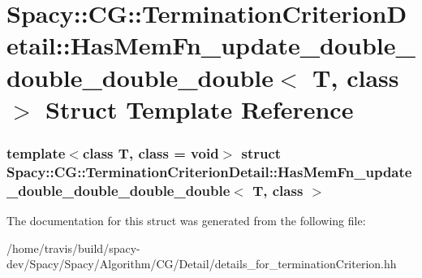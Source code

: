 \hypertarget{structSpacy_1_1CG_1_1TerminationCriterionDetail_1_1HasMemFn__update__double__double__double__double}{\section{\-Spacy\-:\-:\-C\-G\-:\-:\-Termination\-Criterion\-Detail\-:\-:\-Has\-Mem\-Fn\-\_\-update\-\_\-double\-\_\-double\-\_\-double\-\_\-double$<$ \-T, class $>$ \-Struct \-Template \-Reference}
\label{structSpacy_1_1CG_1_1TerminationCriterionDetail_1_1HasMemFn__update__double__double__double__double}
}
\subsubsection*{template$<$class T, class = void$>$ struct Spacy\-::\-C\-G\-::\-Termination\-Criterion\-Detail\-::\-Has\-Mem\-Fn\-\_\-update\-\_\-double\-\_\-double\-\_\-double\-\_\-double$<$ T, class $>$}



\-The documentation for this struct was generated from the following file\-:\begin{DoxyCompactItemize}
\item 
/home/travis/build/spacy-\/dev/\-Spacy/\-Spacy/\-Algorithm/\-C\-G/\-Detail/details\-\_\-for\-\_\-termination\-Criterion.\-hh\end{DoxyCompactItemize}
